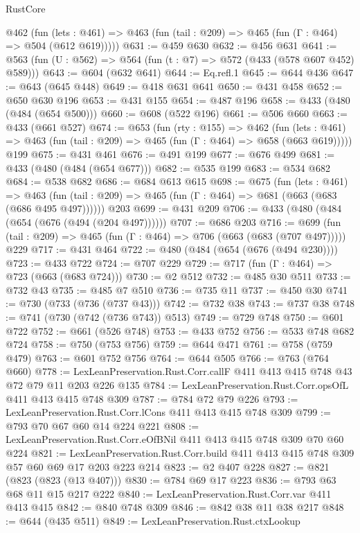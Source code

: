 \begin{lexlean}{RustCore}
\begin{coremodule}
    @462
      (fun (lets : @461) => @463 (fun (tail : @209) => @465 (fun (Γ : @464) => @504 (@612 @619)))))
@631 := @459 @630
@632 := @456 @631
@641 := @563 (fun (U : @562) => @564 (fun (t : @7) => @572 (@433 (@578 @607 @452) @589)))
@643 := @604 (@632 @641)
@644 := Eq.refl.{1}
@645 := @644 @436
@647 := @643 (@645 @448)
@649 := @418 @631 @641
@650 := @431 @458
@652 := @650 @630 @196
@653 := @431 @155
@654 := @487 @196
@658 := @433 (@480 (@484 (@654 @500)))
@660 := @608 (@522 @196)
@661 := @506 @660
@663 := @433 (@661 @527)
@674 := @653
    (fun (rty : @155) =>
    @462
      (fun (lets : @461) => @463 (fun (tail : @209) => @465 (fun (Γ : @464) => @658 (@663 @619)))))
    @199
@675 := @431 @461
@676 := @491 @199
@677 := @676 @499
@681 := @433 (@480 (@484 (@654 @677)))
@682 := @535 @199
@683 := @534 @682
@684 := @538 @682
@686 := @684 @613 @615
@698 := @675
    (fun (lets : @461) =>
    @463 (fun (tail : @209) => @465 (fun (Γ : @464) => @681 (@663 (@683 (@686 @495 @497))))))
    @203
@699 := @431 @209
@706 := @433 (@480 (@484 (@654 (@676 (@494 (@204 @497))))))
@707 := @686 @203
@716 := @699 (fun (tail : @209) => @465 (fun (Γ : @464) => @706 (@663 (@683 (@707 @497))))) @229
@717 := @431 @464
@722 := @480 (@484 (@654 (@676 (@494 @230))))
@723 := @433 @722
@724 := @707 @229
@729 := @717 (fun (Γ : @464) => @723 (@663 (@683 @724)))
@730 := @2 @512
@732 := @485 @30 @511
@733 := @732 @43
@735 := @485 @7 @510
@736 := @735 @11
@737 := @450 @30
@741 := @730 (@733 (@736 (@737 @43)))
@742 := @732 @38
@743 := @737 @38
@748 := @741 (@730 (@742 (@736 @743)) @513)
@749 := @729 @748
@750 := @601 @722
@752 := @661 (@526 @748)
@753 := @433 @752
@756 := @533 @748 @682 @724
@758 := @750 (@753 @756)
@759 := @644 @471
@761 := @758 (@759 @479)
@763 := @601 @752 @756
@764 := @644 @505
@766 := @763 (@764 @660)
@778 := LexLeanPreservation.Rust.Corr.callF @411 @413 @415 @748 @43 @72 @79 @11 @203 @226 @135
@784 := LexLeanPreservation.Rust.Corr.opsOfL @411 @413 @415 @748 @309
@787 := @784 @72 @79 @226
@793 := LexLeanPreservation.Rust.Corr.lCons @411 @413 @415 @748 @309
@799 := @793 @70 @67 @60 @14 @224 @221
@808 := LexLeanPreservation.Rust.Corr.eOfBNil @411 @413 @415 @748 @309 @70 @60 @224
@821 := LexLeanPreservation.Rust.Corr.build @411 @413 @415 @748 @309 @57 @60 @69 @17 @203 @223 @214
@823 := @2 @407 @228
@827 := @821 (@823 (@823 (@13 @407)))
@830 := @784 @69 @17 @223
@836 := @793 @63 @68 @11 @15 @217 @222
@840 := LexLeanPreservation.Rust.Corr.var @411 @413 @415
@842 := @840 @748 @309
@846 := @842 @38 @11 @38 @217
@848 := @644 (@435 @511)
@849 := LexLeanPreservation.Rust.ctxLookup

\end{coremodule}
\end{lexlean}
